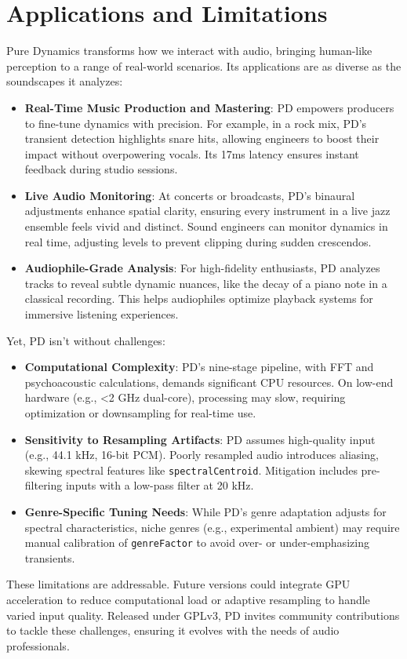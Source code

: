 \documentclass[11pt]{article}
\begin{document}
\section{Applications and Limitations}
Pure Dynamics transforms how we interact with audio, bringing human-like perception to a range of real-world scenarios. Its applications are as diverse as the soundscapes it analyzes:
\begin{itemize}[label=$\bullet$]
  \item \textbf{Real-Time Music Production and Mastering}: PD empowers producers to fine-tune dynamics with precision. For example, in a rock mix, PD’s transient detection highlights snare hits, allowing engineers to boost their impact without overpowering vocals. Its 17ms latency ensures instant feedback during studio sessions.
  \item \textbf{Live Audio Monitoring}: At concerts or broadcasts, PD’s binaural adjustments enhance spatial clarity, ensuring every instrument in a live jazz ensemble feels vivid and distinct. Sound engineers can monitor dynamics in real time, adjusting levels to prevent clipping during sudden crescendos.
  \item \textbf{Audiophile-Grade Analysis}: For high-fidelity enthusiasts, PD analyzes tracks to reveal subtle dynamic nuances, like the decay of a piano note in a classical recording. This helps audiophiles optimize playback systems for immersive listening experiences.
\end{itemize}
Yet, PD isn’t without challenges:
\begin{itemize}[label=$\bullet$]
  \item \textbf{Computational Complexity}: PD’s nine-stage pipeline, with FFT and psychoacoustic calculations, demands significant CPU resources. On low-end hardware (e.g., <2 GHz dual-core), processing may slow, requiring optimization or downsampling for real-time use.
  \item \textbf{Sensitivity to Resampling Artifacts}: PD assumes high-quality input (e.g., 44.1 kHz, 16-bit PCM). Poorly resampled audio introduces aliasing, skewing spectral features like \texttt{spectralCentroid}. Mitigation includes pre-filtering inputs with a low-pass filter at 20 kHz.
  \item \textbf{Genre-Specific Tuning Needs}: While PD’s genre adaptation adjusts for spectral characteristics, niche genres (e.g., experimental ambient) may require manual calibration of \texttt{genreFactor} to avoid over- or under-emphasizing transients.
\end{itemize}
These limitations are addressable. Future versions could integrate GPU acceleration to reduce computational load or adaptive resampling to handle varied input quality. Released under GPLv3, PD invites community contributions to tackle these challenges, ensuring it evolves with the needs of audio professionals.
\end{document}
